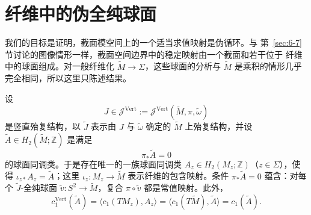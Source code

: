 
\section{纤维中的伪全纯球面}\label{sec:8-4}

我们的目标是证明，截面模空间上的一个适当求值映射是伪循环。与
第~\ref{sec:6-7} 节讨论的图像情形一样，截面空间边界中的稳定映射由一个截面和若干位于
纤维中的球面组成。对一般纤维化 $\widetilde M\to\Sigma$，这些球面的分析与
$\widetilde M$ 是乘积的情形几乎完全相同，所以这里只陈述结果。

设
\[
  J\in\mathcal J^{\mathrm{Vert}}
  :=\mathcal J^{\mathrm{Vert}}(\widetilde M,\pi,\widetilde\omega)
\]
是竖直殆复结构，以 $\widetilde J$ 表示由 $J$ 与 $\widetilde\omega$ 确定的
$\widetilde M$ 上殆复结构，并设
$\widetilde A\in H_2(\widetilde M;\mathbb Z)$ 是满足
\[
  \pi_*\widetilde A=0
\]
的球面同调类。于是存在唯一的一族球面同调类
$A_z\in H_2(M_z;\mathbb Z)$（$z\in\Sigma$），使得
$\iota_{z*}A_z=\widetilde A$；这里
$\iota_z:M_z\to\widetilde M$ 表示纤维的包含映射。条件
$\pi_*\widetilde A=0$ 蕴含：对每个 $\widetilde J$-全纯球面
$\widetilde v:S^2\to\widetilde M$，复合 $\pi\circ\widetilde v$ 都是常值映射。此外，
\[
  c_1^{\mathrm{Vert}}(\widetilde A)
  =\langle c_1(TM_z),A_z\rangle
  =\langle c_1(T\widetilde M),\widetilde A\rangle
  =c_1(\widetilde A).
\]

